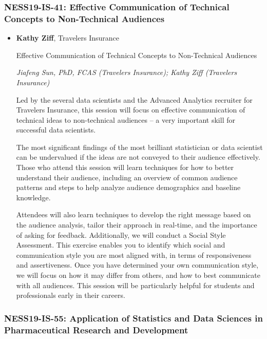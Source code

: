 \begin{itemize}
\end{itemize}

\subsubsection*{NESS19-IS-41: Effective Communication of Technical Concepts to Non-Technical Audiences}

\begin{itemize}
\item \textbf{Kathy Ziff}, Travelers Insurance

Effective Communication of Technical Concepts to Non-Technical Audiences

\emph{\footnotesize Jiafeng Sun, PhD, FCAS (Travelers Insurance); Kathy Ziff (Travelers Insurance)}

Led by the several data scientists and the Advanced Analytics recruiter for Travelers Insurance, this session will focus on effective communication of technical ideas to non-technical audiences – a very important skill for successful data scientists.  

The most significant findings of the most brilliant statistician or data scientist can be undervalued if the ideas are not conveyed to their audience effectively. Those who attend this session will learn techniques for how to better understand their audience, including an overview of common audience patterns and steps to help analyze audience demographics and baseline knowledge.  

Attendees will also learn techniques to develop the right message based on the audience analysis, tailor their approach in real-time, and the importance of asking for feedback. Additionally, we will conduct a Social Style Assessment.  This exercise enables you to identify which social and communication style you are most aligned with, in terms of responsiveness and assertiveness.  Once you have determined your own communication style, we will focus on how it may differ from others, and how to best communicate with all audiences. This session will be particularly helpful for students and professionals early in their careers. 

\end{itemize}

\subsubsection*{NESS19-IS-55: Application of Statistics and Data Sciences in Pharmaceutical Research and Development}

